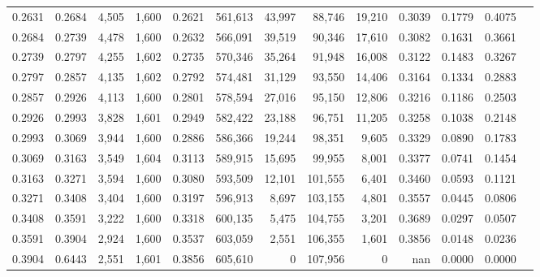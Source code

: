 \begin{tabular}{rrrrrrrrrrrrr}
0.2631 & 0.2684 &  4,505 & 1,600 &                                     0.2621 & 561,613 &  43,997 &  88,746 &  19,210 & 0.3039 & 0.1779 & 0.4075 \\
0.2684 & 0.2739 &  4,478 & 1,600 &                                     0.2632 & 566,091 &  39,519 &  90,346 &  17,610 & 0.3082 & 0.1631 & 0.3661 \\
0.2739 & 0.2797 &  4,255 & 1,602 &                                     0.2735 & 570,346 &  35,264 &  91,948 &  16,008 & 0.3122 & 0.1483 & 0.3267 \\
0.2797 & 0.2857 &  4,135 & 1,602 &                                     0.2792 & 574,481 &  31,129 &  93,550 &  14,406 & 0.3164 & 0.1334 & 0.2883 \\
0.2857 & 0.2926 &  4,113 & 1,600 &                                     0.2801 & 578,594 &  27,016 &  95,150 &  12,806 & 0.3216 & 0.1186 & 0.2503 \\
0.2926 & 0.2993 &  3,828 & 1,601 &                                     0.2949 & 582,422 &  23,188 &  96,751 &  11,205 & 0.3258 & 0.1038 & 0.2148 \\
0.2993 & 0.3069 &  3,944 & 1,600 &                                     0.2886 & 586,366 &  19,244 &  98,351 &   9,605 & 0.3329 & 0.0890 & 0.1783 \\
0.3069 & 0.3163 &  3,549 & 1,604 &                                     0.3113 & 589,915 &  15,695 &  99,955 &   8,001 & 0.3377 & 0.0741 & 0.1454 \\
0.3163 & 0.3271 &  3,594 & 1,600 &                                     0.3080 & 593,509 &  12,101 & 101,555 &   6,401 & 0.3460 & 0.0593 & 0.1121 \\
0.3271 & 0.3408 &  3,404 & 1,600 &                                     0.3197 & 596,913 &   8,697 & 103,155 &   4,801 & 0.3557 & 0.0445 & 0.0806 \\
0.3408 & 0.3591 &  3,222 & 1,600 &                                     0.3318 & 600,135 &   5,475 & 104,755 &   3,201 & 0.3689 & 0.0297 & 0.0507 \\
0.3591 & 0.3904 &  2,924 & 1,600 &                                     0.3537 & 603,059 &   2,551 & 106,355 &   1,601 & 0.3856 & 0.0148 & 0.0236 \\
0.3904 & 0.6443 &  2,551 & 1,601 &                                     0.3856 & 605,610 &       0 & 107,956 &       0 &    nan & 0.0000 & 0.0000 \\
\bottomrule
\end{tabular}
